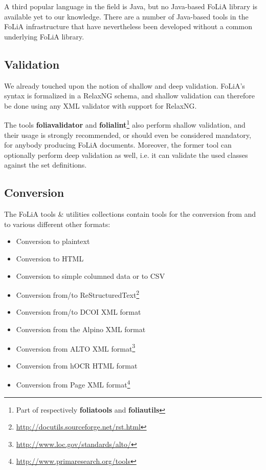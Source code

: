 \documentclass[a4paper,11pt]{article}
\begin{document}
{A third popular language in the field is Java, but no Java-based FoLiA
library is available yet to our knowledge. There are a number of
Java-based tools in the FoLiA infrastructure that have nevertheless been developed
without a common underlying FoLiA library.

\subsection{Validation}

We already touched upon the notion of shallow and deep validation.
FoLiA's syntax is formalized in a RelaxNG schema, and shallow validation can
therefore be done using any XML validator with support for RelaxNG. 

The tools \textbf{foliavalidator} and \textbf{folialint}\footnote{Part of
respectively \textbf{foliatools} and \textbf{foliautils}} also perform shallow validation, and
their usage is strongly recommended, or should even be considered mandatory,
for anybody producing FoLiA documents. Moreover, the former tool can optionally perform
deep validation as well, i.e. it can validate the used classes against the set
definitions.

\subsection{Conversion}

The FoLiA tools \& utilities collections contain tools for the conversion from and to
various different other formats:

\begin{itemize}
    \item Conversion to plaintext
    \item Conversion to HTML
    \item Conversion to simple columned data or to CSV
    \item Conversion from/to ReStructuredText\footnote{\url{http://docutils.sourceforge.net/rst.html}}
    \item Conversion from/to DCOI XML format \cite{DCOI}
    \item Conversion from the Alpino XML format \cite{ALPINO}
    \item Conversion from ALTO XML format\footnote{\url{http://www.loc.gov/standards/alto/}}
    \item Conversion from hOCR HTML format  \cite{Breuel2007}
    \item Conversion from Page XML format\footnote{\url{http://www.primaresearch.org/tools}}
\end{itemize}

}
\end{document}
